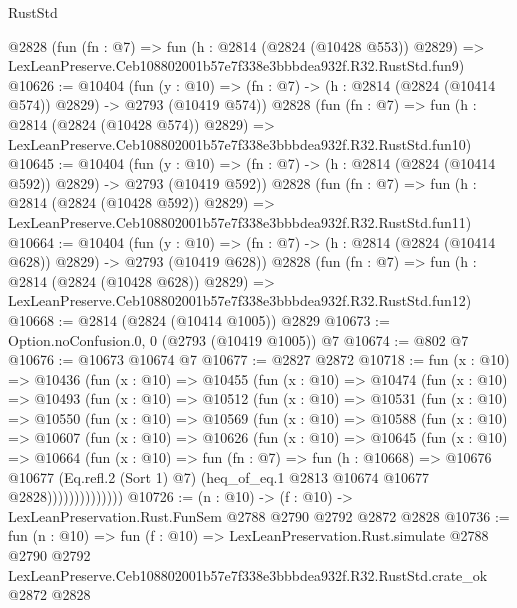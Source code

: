 \begin{lexlean}{RustStd}
\begin{coremodule}
    @2828
    (fun (fn : @7) =>
    fun (h : @2814 (@2824 (@10428 @553)) @2829) =>
    LexLeanPreserve.Ceb108802001b57e7f338e3bbbdea932f.R32.RustStd.fun9)
@10626 := @10404
    (fun (y : @10) => (fn : @7) -> (h : @2814 (@2824 (@10414 @574)) @2829) -> @2793 (@10419 @574))
    @2828
    (fun (fn : @7) =>
    fun (h : @2814 (@2824 (@10428 @574)) @2829) =>
    LexLeanPreserve.Ceb108802001b57e7f338e3bbbdea932f.R32.RustStd.fun10)
@10645 := @10404
    (fun (y : @10) => (fn : @7) -> (h : @2814 (@2824 (@10414 @592)) @2829) -> @2793 (@10419 @592))
    @2828
    (fun (fn : @7) =>
    fun (h : @2814 (@2824 (@10428 @592)) @2829) =>
    LexLeanPreserve.Ceb108802001b57e7f338e3bbbdea932f.R32.RustStd.fun11)
@10664 := @10404
    (fun (y : @10) => (fn : @7) -> (h : @2814 (@2824 (@10414 @628)) @2829) -> @2793 (@10419 @628))
    @2828
    (fun (fn : @7) =>
    fun (h : @2814 (@2824 (@10428 @628)) @2829) =>
    LexLeanPreserve.Ceb108802001b57e7f338e3bbbdea932f.R32.RustStd.fun12)
@10668 := @2814 (@2824 (@10414 @1005)) @2829
@10673 := Option.noConfusion.{0, 0} (@2793 (@10419 @1005)) @7
@10674 := @802 @7
@10676 := @10673 @10674 @7
@10677 := @2827 @2872
@10718 := fun (x : @10) =>
  @10436
    (fun (x : @10) =>
    @10455
      (fun (x : @10) =>
      @10474
        (fun (x : @10) =>
        @10493
          (fun (x : @10) =>
          @10512
            (fun (x : @10) =>
            @10531
              (fun (x : @10) =>
              @10550
                (fun (x : @10) =>
                @10569
                  (fun (x : @10) =>
                  @10588
                    (fun (x : @10) =>
                    @10607
                      (fun (x : @10) =>
                      @10626
                        (fun (x : @10) =>
                        @10645
                          (fun (x : @10) =>
                          @10664
                            (fun (x : @10) =>
                            fun (fn : @7) =>
                            fun (h : @10668) =>
                            @10676
                              @10677
                              (Eq.refl.{2} (Sort 1) @7)
                              (heq_of_eq.{1} @2813 @10674 @10677 @2828))))))))))))))
@10726 := (n : @10) -> (f : @10) -> LexLeanPreservation.Rust.FunSem @2788 @2790 @2792 @2872 @2828
@10736 := fun (n : @10) =>
  fun (f : @10) =>
  LexLeanPreservation.Rust.simulate
    @2788
    @2790
    @2792
    LexLeanPreserve.Ceb108802001b57e7f338e3bbbdea932f.R32.RustStd.crate_ok
    @2872
    @2828
\end{coremodule}
\end{lexlean}
